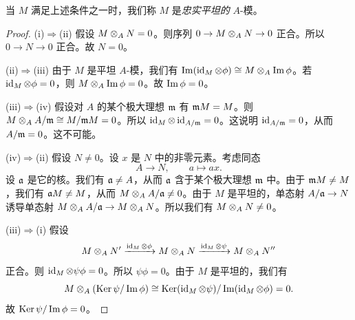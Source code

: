 当 $M$ 满足上述条件之一时，我们称 $M$ 是\emph{忠实平坦的} $A$-模。
\begin{proof}
(i)$\Rightarrow$(ii) 假设 $M\otimes_AN=0$。则序列 $0\to M\otimes_AN\to0$ 正合。所以 $0\to N\to0$ 正合。故 $N=0$。

(ii)$\Rightarrow$(iii) 由于 $M$ 是平坦 $A$-模，我们有 $\operatorname{Im}(\operatorname{id}_M\otimes\phi)\cong M\otimes_A\operatorname{Im}\phi$。若 $\operatorname{id}_M\otimes\phi=0$，则 $M\otimes_A\operatorname{Im}\phi=0$。故 $\operatorname{Im}\phi=0$。

(iii)$\Rightarrow$(iv) 假设对 $A$ 的某个极大理想 $\mathfrak{m}$ 有 $\mathfrak{m} M=M$。则 $M\otimes_AA/\mathfrak{m}\cong M/\mathfrak{m} M=0$。所以 $\operatorname{id}_M\otimes\operatorname{id}_{A/\mathfrak{m}}=0$。这说明 $\operatorname{id}_{A/\mathfrak{m}}=0$，从而 $A/\mathfrak{m}=0$。这不可能。

(iv)$\Rightarrow$(ii) 假设 $N\ne0$。设 $x$ 是 $N$ 中的非零元素。考虑同态
\[
A\to N,\qquad a\mapsto ax.
\]
设 $\mathfrak{a}$ 是它的核。我们有 $\mathfrak{a}\ne A$，从而 $\mathfrak{a}$ 含于某个极大理想 $\mathfrak{m}$ 中。由于 $\mathfrak{m} M\ne M$，我们有 $\mathfrak{a} M\ne M$，从而 $M\otimes_AA/\mathfrak{a}\ne0$。由于 $M$ 是平坦的，单态射 $A/\mathfrak{a}\to N$ 诱导单态射 $M\otimes_AA/\mathfrak{a}\to M\otimes_AN$。所以我们有 $M\otimes_AN\ne0$。

(iii)$\Rightarrow$(i) 假设
\[
M\otimes_AN'\xrightarrow{\operatorname{id}_M\otimes\phi}M\otimes_AN\xrightarrow{\operatorname{id}_M\otimes\psi}M\otimes_AN''
\]
正合。则 $\operatorname{id}_M\otimes\psi\phi=0$。所以 $\psi\phi=0$。由于 $M$ 是平坦的，我们有
\[
M\otimes_A(\operatorname{Ker}\psi/\operatorname{Im}\phi)\cong\operatorname{Ker}(\operatorname{id}_M\otimes\psi)/\operatorname{Im}(\operatorname{id}_M\otimes\phi)=0.
\]
故 $\operatorname{Ker}\psi/\operatorname{Im}\phi=0$。
\end{proof}

